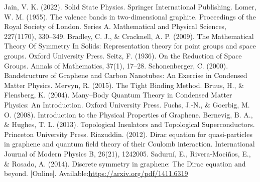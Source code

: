 \cleardoublepage
{}
\begin{thebibliography}{X}


	 Jain, V. K. (2022). Solid State Physics. Springer International Publishing.
	 Lomer, W. M. (1955). The valence bands in two-dimensional graphite. Proceedings of the Royal Society of London. Series A. Mathematical and Physical Sciences, 227(1170), 330–349.
	Bradley, C. J., \& Cracknell, A. P. (2009). The Mathematical Theory Of Symmetry In Solids: Representation theory for point groups and space groups. Oxford University Press.
	Seitz, F. (1936). On the Reduction of Space Groups. Annals of Mathematics, 37(1), 17–28.
	Schonenberger, C. (2000). Bandstructure of Graphene and Carbon Nanotubes: An Exercise in Condensed Matter Physics.
	Mervyn, R. (2015). The Tight Binding Method.
		Bruus, H., \& Flensberg, K. (2004). Many–Body Quantum Theory in Condensed Matter Physics: An Introduction. Oxford University Press.
	Fuchs, J.-N., \& Goerbig, M. O. (2008). Introduction to the Physical Properties of Graphene.
	Bernevig, B. A., \& Hughes, T. L. (2013). Topological Insulators and Topological Superconductors. Princeton University Press.
	Riazuddin. (2012). Dirac equation for quasi-particles in graphene and quantum field theory of their Coulomb interaction. International Journal of Modern Physics B, 26(21), 1242005.
	 Sadurní, E., Rivera-Mociños, E., \& Rosado, A. (2014). Discrete symmetry in graphene: The Dirac equation and beyond. [Online]. Available:\url{https://arxiv.org/pdf/1411.6319}
\end{thebibliography}
